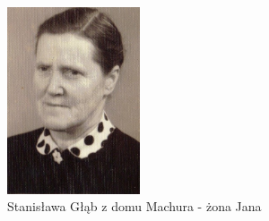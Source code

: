 \begin{figure}[!h]
\begin{center}
\includegraphics[width=0.35\textwidth]{zdjecia/stanislawa_glab.jpg}
\caption[Stanisława Głąb]{Stanisława Głąb z domu Machura - żona Jana}
\label{rys:stanislawa_glab}
\end{center}
\end{figure}

